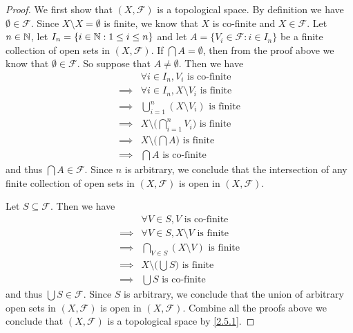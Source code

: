 \begin{proof}
  We first show that \((X, \mathcal{F})\) is a topological space.
  By definition we have \(\emptyset \in \mathcal{F}\).
  Since \(X \setminus X = \emptyset\) is finite, we know that \(X\) is co-finite and \(X \in \mathcal{F}\).
  Let \(n \in \mathbb{N}\), let \(I_n = \{i \in \mathbb{N} : 1 \leq i \leq n\}\) and let \(A = \{V_i \in \mathcal{F} : i \in I_n\}\) be a finite collection of open sets in \((X, \mathcal{F})\).
  If \(\bigcap A = \emptyset\), then from the proof above we know that \(\emptyset \in \mathcal{F}\).
  So suppose that \(A \neq \emptyset\).
  Then we have
  \begin{align*}
             & \forall i \in I_n, V_i \text{ is co-finite}                     \\
    \implies & \forall i \in I_n, X \setminus V_i \text{ is finite}            \\
    \implies & \bigcup_{i = 1}^n (X \setminus V_i) \text{ is finite}           \\
    \implies & X \setminus \bigg(\bigcap_{i = 1}^n V_i\bigg) \text{ is finite} \\
    \implies & X \setminus \bigg(\bigcap A\bigg) \text{ is finite}             \\
    \implies & \bigcap A \text{ is co-finite}
  \end{align*}
  and thus \(\bigcap A \in \mathcal{F}\).
  Since \(n\) is arbitrary, we conclude that the intersection of any finite collection of open sets in \((X, \mathcal{F})\) is open in \((X, \mathcal{F})\).

  Let \(S \subseteq \mathcal{F}\).
  Then we have
  \begin{align*}
             & \forall V \in S, V \text{ is co-finite}             \\
    \implies & \forall V \in S, X \setminus V \text{ is finite}    \\
    \implies & \bigcap_{V \in S} (X \setminus V) \text{ is finite} \\
    \implies & X \setminus \bigg(\bigcup S\bigg) \text{ is finite} \\
    \implies & \bigcup S \text{ is co-finite}
  \end{align*}
  and thus \(\bigcup S \in \mathcal{F}\).
  Since \(S\) is arbitrary, we conclude that the union of arbitrary open sets in \((X, \mathcal{F})\) is open in \((X, \mathcal{F})\).
  Combine all the proofs above we conclude that \((X, \mathcal{F})\) is a topological space by \cref{2.5.1}.


\end{proof}
